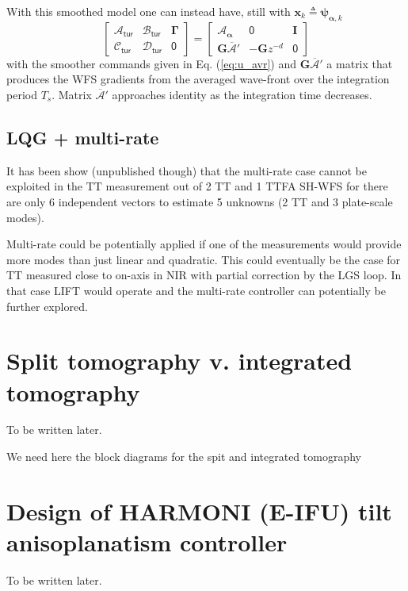 \documentclass[a4paper,12pt]{article}
\newcommand{\0}{\mathsf{0}} %
\newcommand{\I}{\mathbf{I}} %
\newcommand{\z}{{z}} %
\newcommand{\D}{\mathbf{G}} %
\newcommand{\Ad}{\mathcal{A}_\mathsf{tur}} %
\newcommand{\Bd}{\mathcal{B}_\mathsf{tur}} %
\newcommand{\Cd}{\mathcal{C}_\mathsf{tur}} %
\newcommand{\Dd}{\mathcal{D}_\mathsf{tur}} %
\newcommand{\Vd}{\boldsymbol{\Gamma}}
\newcommand{\alphavec}{{\boldsymbol{\alpha}}}
\newcommand{\phivec}{{\boldsymbol{\psi}}}
\newcommand{\xvec}{{\mathbf{x}}}
\begin{document}
With this smoothed model one can instead have, still with  $ \xvec_{k}\triangleq \phivec_{\alphavec,k}$ 
\begin{equation}\label{eq:stack_ss_c_tur_compact}
  \left[\begin{array}{c|c|c}
      \Ad & \Bd &  \Vd\\\hline
      \Cd & \Dd  & \0
    \end{array}\right]
=
\left[\begin{array}{c|c|c}
      \mathcal{A}_\alphavec & \0 & \I \\\hline
      \D\overline{\mathcal{A}}' & -\D\z^{-d} & \0
    \end{array}\right]
\end{equation}
with the smoother commands given in Eq. (\ref{eq:u_avr}) and $\D\overline{\mathcal{A}}'$ a matrix that produces the WFS gradients from the averaged wave-front over the integration period $T_s$. Matrix $\overline{\mathcal{A}}'$ approaches identity as the integration time decreases.

\subsection{LQG + multi-rate}

It has been show (unpublished though) that the multi-rate case cannot
be exploited in the TT measurement out of 2 TT and 1 TTFA SH-WFS for
there are only 6 independent vectors to estimate 5 unknowns (2 TT and
3 plate-scale modes). 

Multi-rate could be potentially applied if one of the measurements
would provide more modes than just linear and quadratic. This could
eventually be the case for TT measured close to on-axis in NIR with
partial correction by the LGS loop. In that case LIFT would operate
and the multi-rate controller can potentially be further explored.


\section{Split tomography v. integrated tomography}
To be written later.

{\color{red} 
We need here the block diagrams for the spit and integrated tomography}



\section{Design of HARMONI (E-IFU) tilt anisoplanatism controller}
To be written later.
\end{document}
